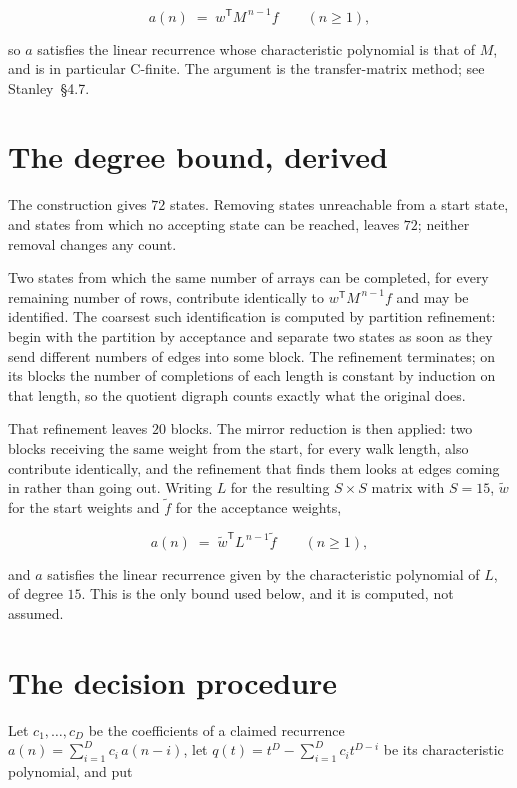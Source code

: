 \documentclass[11pt]{article}
\theoremstyle{definition}
\begin{document}
\[a(n) \;=\; w^{\mathsf T} M^{\,n-1} f \qquad (n \ge 1),\]

so $a$ satisfies the linear recurrence whose characteristic polynomial is that of $M$, and is in particular C-finite. The argument is the transfer-matrix method; see Stanley~\S4.7.

\section{The degree bound, derived}

The construction gives $72$ states. Removing states unreachable from a start state, and states from which no accepting state can be reached, leaves $72$; neither removal changes any count.

Two states from which the same number of arrays can be completed, for every remaining number of rows, contribute identically to $w^{\mathsf T}M^{\,n-1}f$ and may be identified. The coarsest such identification is computed by partition refinement: begin with the partition by acceptance and separate two states as soon as they send different numbers of edges into some block. The refinement terminates; on its blocks the number of completions of each length is constant by induction on that length, so the quotient digraph counts exactly what the original does.

That refinement leaves $20$ blocks. The mirror reduction is then applied: two blocks receiving the same weight from the start, for every walk length, also contribute identically, and the refinement that finds them looks at edges coming in rather than going out. Writing $L$ for the resulting $S \times S$ matrix with $S = 15$, $\tilde w$ for the start weights and $\tilde f$ for the acceptance weights,

\[a(n) \;=\; \tilde w^{\mathsf T} L^{\,n-1} \tilde f \qquad (n \ge 1),\]

and $a$ satisfies the linear recurrence given by the characteristic polynomial of $L$, of degree $15$. This is the only bound used below, and it is computed, not assumed.

\section{The decision procedure}

Let $c_1,\dots,c_D$ be the coefficients of a claimed recurrence $a(n) = \sum_{i=1}^{D} c_i\,a(n-i)$, let $q(t) = t^{D} - \sum_{i=1}^{D} c_i t^{D-i}$ be its characteristic polynomial, and put
\end{document}
